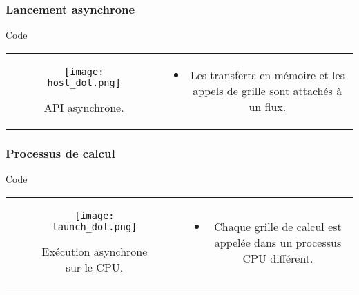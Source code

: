 \begin{frame}
    \frametitle{Lancement asynchrone}
\begin{block}{Code}
   \begin{tabular}{cc}
        \begin{minipage}{0.45\textwidth}
 \begin{figure}[htbp]
    \centering
   \texttt{[image: host\_dot.png]}
    \caption{API asynchrone.}
    \label{fig:host_dot}
\end{figure}
        \end{minipage} & 
        \begin{minipage}{0.45\textwidth}
            \begin{itemize}
                \item<+-> Les transferts en mémoire et les appels de grille sont attachés à un flux.
           \end{itemize}
        \end{minipage}
\end{tabular}
\end{block}
\end{frame}
\begin{frame}
    \frametitle{Processus de calcul}
\begin{block}{Code}
   \begin{tabular}{cc}
        \begin{minipage}{0.45\textwidth}
 \begin{figure}[htbp]
    \centering
   \texttt{[image: launch\_dot.png]}
    \caption{Exécution asynchrone sur le CPU.}
    \label{fig:launch_dot}
\end{figure}
        \end{minipage} & 
        \begin{minipage}{0.45\textwidth}
            \begin{itemize}
                \item<+-> Chaque grille de calcul est appelée dans un processus CPU différent.
           \end{itemize}
        \end{minipage}
\end{tabular}
\end{block}
\end{frame}
